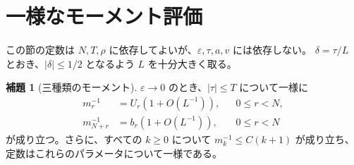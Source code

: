 \documentclass[12pt]{amsart}
\theoremstyle{definition}
\theoremstyle{remark}
\numberwithin{equation}{section}
\theoremstyle{definition}
\newtheorem{jlem}[thm]{補題}
\begin{document}
\section{一様なモーメント評価}
この節の定数は $N,T,\rho$ に依存してよいが、$\varepsilon,\tau,a,v$ には依存しない。
$\delta=\tau/L$ とおき、$|\delta|\le1/2$ となるよう $L$ を十分大きく取る。

\begin{jlem}[三種類のモーメント]\label{ja:momentlemma}
$\varepsilon\to0$ のとき、$|\tau|\le T$ について一様に
\begin{align}
 m_r^{-1}&=U_r(1+O(L^{-1})),&&0\le r<N,\label{ja:lowmom}\\
 m_{N+r}^{-1}&=b_r(1+O(L^{-1})),&&0\le r<N\label{ja:highmom}
\end{align}
が成り立つ。さらに、すべての $k\ge0$ について
$m_k^{-1}\le C(k+1)$ が成り立ち、定数はこれらのパラメータについて一様である。
\end{jlem}
\end{document}

